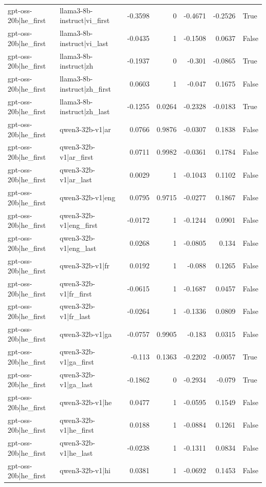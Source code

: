 \begin{table}
\begin{tabular}{l l r r r r l}
gpt-oss-20b|he_first & llama3-8b-instruct|vi_first & -0.3598 & 0 & -0.4671 & -0.2526 & True \\
gpt-oss-20b|he_first & llama3-8b-instruct|vi_last & -0.0435 & 1 & -0.1508 & 0.0637 & False \\
gpt-oss-20b|he_first & llama3-8b-instruct|zh & -0.1937 & 0 & -0.301 & -0.0865 & True \\
gpt-oss-20b|he_first & llama3-8b-instruct|zh_first & 0.0603 & 1 & -0.047 & 0.1675 & False \\
gpt-oss-20b|he_first & llama3-8b-instruct|zh_last & -0.1255 & 0.0264 & -0.2328 & -0.0183 & True \\
gpt-oss-20b|he_first & qwen3-32b-v1|ar & 0.0766 & 0.9876 & -0.0307 & 0.1838 & False \\
gpt-oss-20b|he_first & qwen3-32b-v1|ar_first & 0.0711 & 0.9982 & -0.0361 & 0.1784 & False \\
gpt-oss-20b|he_first & qwen3-32b-v1|ar_last & 0.0029 & 1 & -0.1043 & 0.1102 & False \\
gpt-oss-20b|he_first & qwen3-32b-v1|eng & 0.0795 & 0.9715 & -0.0277 & 0.1867 & False \\
gpt-oss-20b|he_first & qwen3-32b-v1|eng_first & -0.0172 & 1 & -0.1244 & 0.0901 & False \\
gpt-oss-20b|he_first & qwen3-32b-v1|eng_last & 0.0268 & 1 & -0.0805 & 0.134 & False \\
gpt-oss-20b|he_first & qwen3-32b-v1|fr & 0.0192 & 1 & -0.088 & 0.1265 & False \\
gpt-oss-20b|he_first & qwen3-32b-v1|fr_first & -0.0615 & 1 & -0.1687 & 0.0457 & False \\
gpt-oss-20b|he_first & qwen3-32b-v1|fr_last & -0.0264 & 1 & -0.1336 & 0.0809 & False \\
gpt-oss-20b|he_first & qwen3-32b-v1|ga & -0.0757 & 0.9905 & -0.183 & 0.0315 & False \\
gpt-oss-20b|he_first & qwen3-32b-v1|ga_first & -0.113 & 0.1363 & -0.2202 & -0.0057 & True \\
gpt-oss-20b|he_first & qwen3-32b-v1|ga_last & -0.1862 & 0 & -0.2934 & -0.079 & True \\
gpt-oss-20b|he_first & qwen3-32b-v1|he & 0.0477 & 1 & -0.0595 & 0.1549 & False \\
gpt-oss-20b|he_first & qwen3-32b-v1|he_first & 0.0188 & 1 & -0.0884 & 0.1261 & False \\
gpt-oss-20b|he_first & qwen3-32b-v1|he_last & -0.0238 & 1 & -0.1311 & 0.0834 & False \\
gpt-oss-20b|he_first & qwen3-32b-v1|hi & 0.0381 & 1 & -0.0692 & 0.1453 & False \\

\end{tabular}
\end{table}
